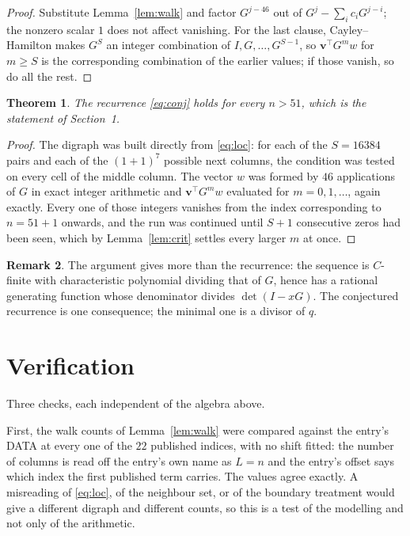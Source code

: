 \documentclass[11pt,a4paper]{article}
\theoremstyle{plain}
\newtheorem{theorem}{Theorem}
\theoremstyle{definition}
\newtheorem{remark}[theorem]{Remark}
\begin{document}
\begin{proof}
Substitute Lemma~\ref{lem:walk} and factor $G^{j-46}$ out of
$G^{j}-\sum_ic_iG^{j-i}$; the nonzero scalar $1$ does not affect
vanishing. For the last clause, Cayley--Hamilton makes $G^{S}$ an integer combination of
$I,G,\dots,G^{S-1}$, so $\mathbf{v}^{\!\top}G^{m}w$ for $m\ge S$ is the corresponding
combination of the earlier values; if those vanish, so do all the rest.
\end{proof}

\begin{theorem}
The recurrence \eqref{eq:conj} holds for every $n>51$, which is the statement of
Section~1.
\end{theorem}

\begin{proof}
The digraph was built directly from \eqref{eq:loc}: for each of the $S=16384$ pairs and each
of the $(1+1)^{7}$ possible next columns, the condition was tested on every cell of
the middle column. The vector $w$ was formed by $46$ applications of $G$ in exact integer
arithmetic and $\mathbf{v}^{\!\top}G^{m}w$ evaluated for $m=0,1,\dots$, again exactly.
Every one of those integers vanishes from the index corresponding to $n=51+1$ onwards,
and the run was continued until $S+1$ consecutive zeros had been seen, which by
Lemma~\ref{lem:crit} settles every larger $m$ at once.
\end{proof}

\begin{remark}
The argument gives more than the recurrence: the sequence is $C$-finite with characteristic
polynomial dividing that of $G$, hence has a rational generating function whose denominator
divides $\det(I-xG)$. The conjectured recurrence is one consequence; the minimal one is a
divisor of $q$.
\end{remark}

\section{Verification}

Three checks, each independent of the algebra above.

First, the walk counts of Lemma~\ref{lem:walk} were compared against the entry's DATA at
every one of the $22$ published indices, with no shift fitted: the number of columns is
read off the entry's own name as $L=n$ and the entry's offset says which index the first
published term carries. The values agree exactly. A misreading of \eqref{eq:loc}, of the
neighbour set, or of the boundary treatment would give a different digraph and different
counts, so this is a test of the modelling and not only of the arithmetic.
\end{document}
